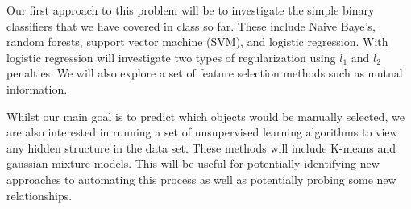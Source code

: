 Our first approach to this problem will be to investigate the simple binary classifiers that we have covered in class so far. These include Naive Baye's, random forests, support vector machine (SVM), and logistic regression. With logistic regression will investigate two types of regularization using $l_1$ and $l_2$ penalties. We will also explore a set of feature selection methods such as mutual information.

Whilst our main goal is to predict which objects would be manually selected, we are also interested in running a set of unsupervised learning algorithms to view any hidden structure in the data set. These methods will include K-means and gaussian mixture models. This will be useful for potentially identifying new approaches to automating this process as well as potentially probing some new relationships.